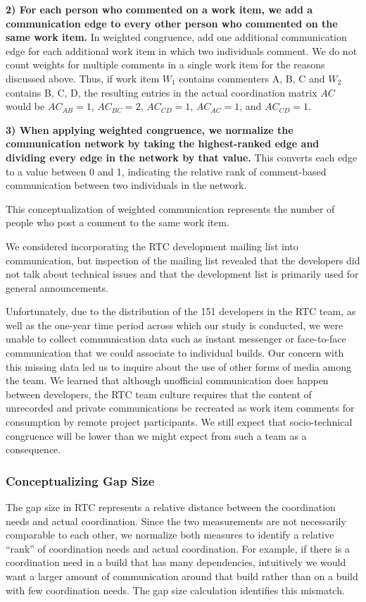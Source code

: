\textbf{2) For each person who commented on a work item, we add a communication edge to every other person who commented on the same work item.} In weighted congruence, add one additional communication edge for each additional work item in which two individuals comment. We do not count weights for multiple comments in a single work item for the reasons discussed above. Thus, if work item $W_1$ contains commenters {A, B, C} and $W_2$ contains {B, C, D}, the resulting entries in the actual coordination matrix $AC$ would be $AC_{AB}=1$, $AC_{BC}=2$, $AC_{CD}=1$, $AC_{AC}=1$, and $AC_{CD}=1$.

\textbf{3) When applying weighted congruence, we normalize the communication network by taking the highest-ranked edge and dividing every edge in the network by that value.} This converts each edge to a value between 0 and 1, indicating the relative rank of comment-based communication between two individuals in the network.

This conceptualization of weighted communication represents the number of people who post a comment to the same work item.

We considered incorporating the RTC development mailing list into communication, but inspection of the mailing list revealed that the developers did not talk about technical issues and that the development list is primarily used for general announcements.

Unfortunately, due to the distribution of the 151 developers in the RTC team, as well as the one-year time period across which our study is conducted, we were unable to collect communication data such as instant messenger or face-to-face communication that we could associate to individual builds. Our concern with this missing data led us to inquire about the use of other forms of media among the team. We learned that although unofficial communication does happen between developers, the RTC team culture requires that the content of unrecorded and private communications be recreated as work item comments for consumption by remote project participants. We still expect that socio-technical congruence will be lower than we might expect from such a team as a consequence.

\subsubsection{Conceptualizing Gap Size}

The gap size in RTC represents a relative distance between the coordination needs and actual coordination. Since the two measurements are not necessarily comparable to each other, we normalize both measures to identify a relative ``rank'' of coordination needs and actual coordination. For example, if there is a coordination need in a build that has many dependencies, intuitively we would want a larger amount of communication around that build rather than on a build with few coordination needs. The gap size calculation identifies this mismatch.

